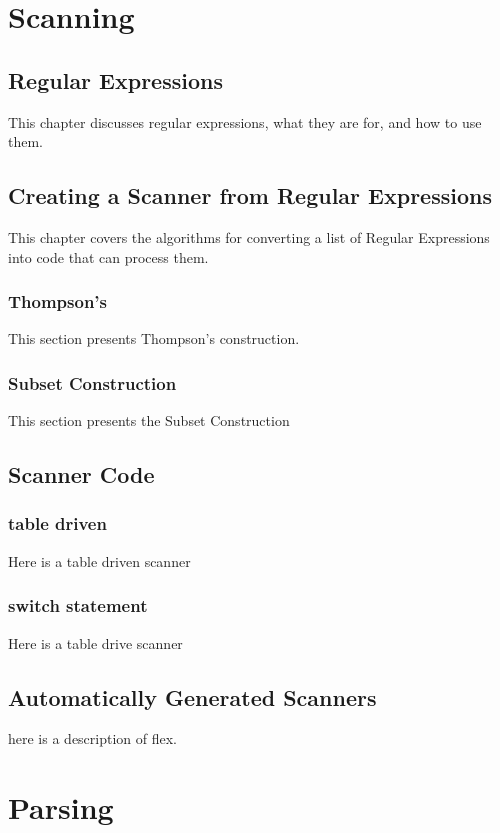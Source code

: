 \documentclass[letterpaper,12pt,openany,reqno]{book}%
\begin{document}
\begin{emumerate}
\part{Scanning}

\chapter{Regular Expressions}

This chapter discusses regular expressions, what they are for, and how to use them.

\chapter{Creating a Scanner from Regular Expressions}

This chapter covers the algorithms for converting a list of Regular Expressions into code that can process them.

\section{Thompson's}

This section presents Thompson's construction.

\section{Subset Construction}

This section presents the Subset Construction

\chapter{Scanner Code}
\section{table driven}
Here is a table driven scanner
\section{switch statement}
Here is a table drive scanner

\chapter{Automatically Generated Scanners}
here is a description of flex.

\part{Parsing}

\end{emumerate}
\end{document}
